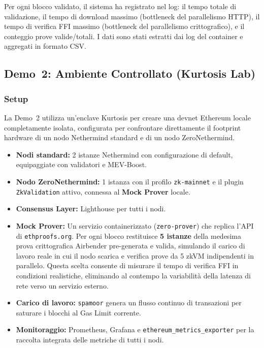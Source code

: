 \documentclass[12pt,a4paper,openright,twoside]{report}
\begin{document}
Per ogni blocco validato, il sistema ha registrato nel log: il tempo totale di validazione, il tempo di download massimo (bottleneck del parallelismo HTTP), il tempo di verifica FFI massimo (bottleneck del parallelismo crittografico), e il conteggio prove valide/totali. I dati sono stati estratti dai log del container e aggregati in formato CSV.


\subsection{Demo~2: Ambiente Controllato (Kurtosis Lab)}\label{sec:demo2}

\subsubsection{Setup}

La Demo~2 utilizza un'enclave Kurtosis per creare una devnet Ethereum locale completamente isolata, configurata per confrontare direttamente il footprint hardware di un nodo Nethermind standard e di un nodo ZeroNethermind.

\begin{itemize}
    \item \textbf{Nodi standard:} 2 istanze Nethermind con configurazione di default, equipaggiate con validatori e MEV-Boost.
    \item \textbf{Nodo ZeroNethermind:} 1 istanza con il profilo \texttt{zk-mainnet} e il plugin \texttt{ZkValidation} attivo, connessa al \textbf{Mock Prover} locale.
    \item \textbf{Consensus Layer:} Lighthouse per tutti i nodi.
    \item \textbf{Mock Prover:} Un servizio containerizzato (\texttt{zero-prover}) che replica l'API di \texttt{ethproofs.org}. Per ogni blocco restituisce \textbf{5 istanze} della medesima prova crittografica Airbender pre-generata e valida, simulando il carico di lavoro reale in cui il nodo scarica e verifica prove da 5 zkVM indipendenti in parallelo. Questa scelta consente di misurare il tempo di verifica FFI in condizioni realistiche, eliminando al contempo la variabilità della latenza di rete verso un servizio esterno.
    \item \textbf{Carico di lavoro:} \texttt{spamoor} genera un flusso continuo di transazioni per saturare i blocchi al Gas Limit corrente.
    \item \textbf{Monitoraggio:} Prometheus, Grafana e \texttt{ethereum\_metrics\_exporter} per la raccolta integrata delle metriche di tutti i nodi.
\end{itemize}
\end{document}

